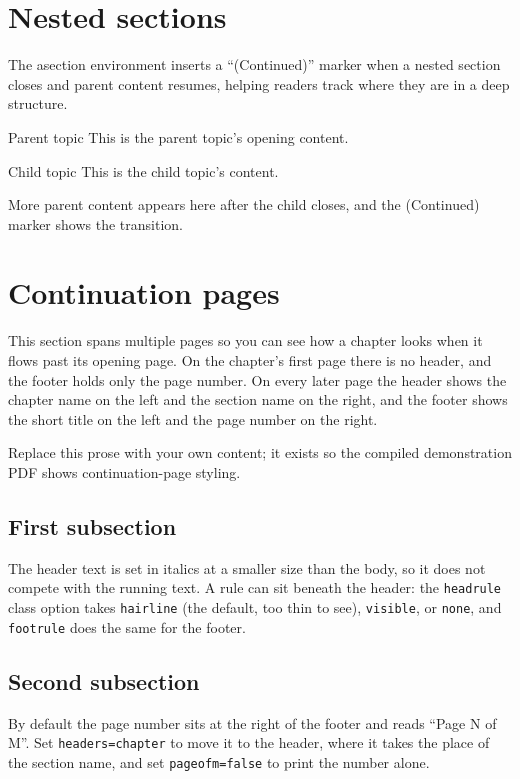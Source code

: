\section{Nested sections}
The asection environment inserts a ``(Continued)'' marker when a nested section closes and parent content resumes, helping readers track where they are in a deep structure.

\begin{asection}{Parent topic}
This is the parent topic's opening content.

\begin{asection}{Child topic}
This is the child topic's content.
\end{asection}

More parent content appears here after the child closes, and the (Continued) marker shows the transition.
\end{asection}

\section{Continuation pages}
This section spans multiple pages so you can see how a chapter looks when it flows past its opening page. On the chapter's first page there is no header, and the footer holds only the page number. On every later page the header shows the chapter name on the left and the section name on the right, and the footer shows the short title on the left and the page number on the right.

Replace this prose with your own content; it exists so the compiled demonstration PDF shows continuation-page styling.

\subsection{First subsection}
The header text is set in italics at a smaller size than the body, so it does not compete with the running text. A rule can sit beneath the header: the \texttt{headrule} class option takes \texttt{hairline} (the default, too thin to see), \texttt{visible}, or \texttt{none}, and \texttt{footrule} does the same for the footer.

\subsection{Second subsection}
By default the page number sits at the right of the footer and reads ``Page N of M''. Set \texttt{headers=chapter} to move it to the header, where it takes the place of the section name, and set \texttt{pageofm=false} to print the number alone.

